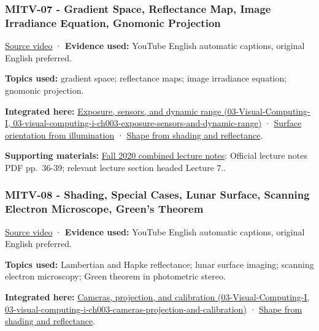 \subsubsection{MITV-07 - Gradient Space, Reflectance Map, Image Irradiance Equation, Gnomonic Projection}\label{04-visual-computing-ii-ch036-mitv-07---gradient-space-reflectance-map-image-irradiance-equation-gnomonic-projection}

\href{https://www.youtube.com/watch?v=qqtEQsBjh28}{Source video} · \textbf{Evidence used:} YouTube English automatic captions, original English preferred.

\textbf{Topics used:} gradient space; reflectance maps; image irradiance equation; gnomonic projection.

\textbf{Integrated here:} \href{../03-Visual-Computing-I/main.pdf\#nameddest=03-visual-computing-i-ch003-exposure-sensors-and-dynamic-range}{Exposure, sensors, and dynamic range (03-Visual-Computing-I, 03-visual-computing-i-ch003-exposure-sensors-and-dynamic-range)} · \hyperref[04-visual-computing-ii-ch032-surface-orientation-from-illumination]{Surface orientation from illumination} · \hyperref[04-visual-computing-ii-ch032-shape-from-shading-and-reflectance]{Shape from shading and reflectance}.

\textbf{Supporting materials:} \href{https://ocw.mit.edu/courses/6-801-machine-vision-fall-2020/9ec44f69e72995c370b3797818ba01e6_MIT6_801F20_lectureNotes.pdf}{Fall 2020 combined lecture notes}: Official lecture notes PDF pp.~36-39; relevant lecture section headed Lecture 7..

\subsubsection{MITV-08 - Shading, Special Cases, Lunar Surface, Scanning Electron Microscope, Green's Theorem}\label{04-visual-computing-ii-ch036-mitv-08---shading-special-cases-lunar-surface-scanning-electron-microscope-greens-theorem}

\href{https://www.youtube.com/watch?v=LP7z6vVmnms}{Source video} · \textbf{Evidence used:} YouTube English automatic captions, original English preferred.

\textbf{Topics used:} Lambertian and Hapke reflectance; lunar surface imaging; scanning electron microscopy; Green theorem in photometric stereo.

\textbf{Integrated here:} \href{../03-Visual-Computing-I/main.pdf\#nameddest=03-visual-computing-i-ch003-cameras-projection-and-calibration}{Cameras, projection, and calibration (03-Visual-Computing-I, 03-visual-computing-i-ch003-cameras-projection-and-calibration)} · \hyperref[04-visual-computing-ii-ch032-shape-from-shading-and-reflectance]{Shape from shading and reflectance}.

